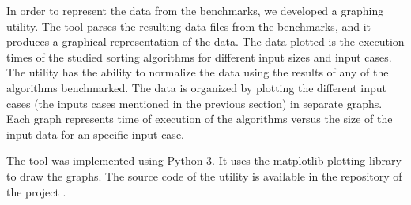 In order to represent the data from the benchmarks, we developed a graphing utility. The tool parses the resulting data files from the benchmarks, and it produces a graphical representation of the data. The data plotted is the execution times of the studied sorting algorithms for different input sizes and input cases. The utility has the ability to normalize the data using the results of any of the algorithms benchmarked. The data is organized by plotting the different input cases (the inputs cases mentioned in the previous section) in separate graphs. Each graph represents time of execution of the algorithms versus the size of the input data for an specific input case.

The tool was implemented using Python 3. It uses the matplotlib plotting library to draw the graphs. The source code of the utility is available in the repository of the project \cite{GitHubProjectURL}.

